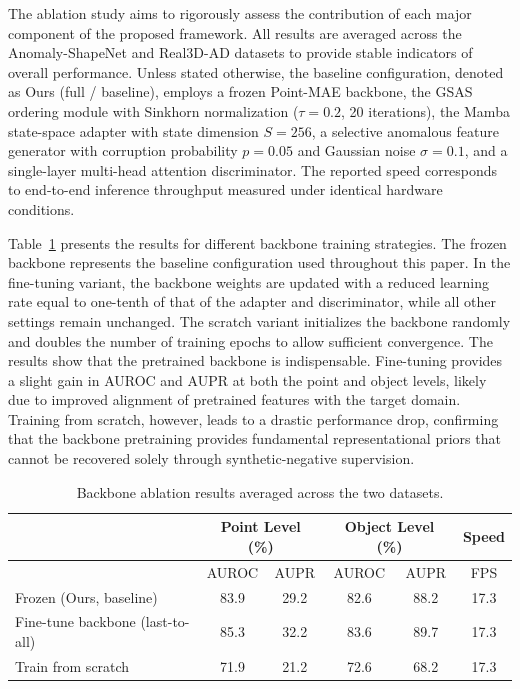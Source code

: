 The ablation study aims to rigorously assess the contribution of each major component of the proposed framework. All results are averaged across the Anomaly-ShapeNet and Real3D-AD datasets to provide stable indicators of overall performance. Unless stated otherwise, the baseline configuration, denoted as Ours (full / baseline), employs a frozen Point-MAE backbone, the GSAS ordering module with Sinkhorn normalization (\(\tau=0.2\), 20 iterations), the Mamba state-space adapter with state dimension \(S=256\), a selective anomalous feature generator with corruption probability \(p=0.05\) and Gaussian noise \(\sigma=0.1\), and a single-layer multi-head attention discriminator. The reported speed corresponds to end-to-end inference throughput measured under identical hardware conditions.

Table~\ref{tab:backbone_ablation} presents the results for different backbone training strategies. The frozen backbone represents the baseline configuration used throughout this paper. In the fine-tuning variant, the backbone weights are updated with a reduced learning rate equal to one-tenth of that of the adapter and discriminator, while all other settings remain unchanged. The scratch variant initializes the backbone randomly and doubles the number of training epochs to allow sufficient convergence. The results show that the pretrained backbone is indispensable. Fine-tuning provides a slight gain in AUROC and AUPR at both the point and object levels, likely due to improved alignment of pretrained features with the target domain. Training from scratch, however, leads to a drastic performance drop, confirming that the backbone pretraining provides fundamental representational priors that cannot be recovered solely through synthetic-negative supervision.

\begin{table}[ht]
\centering
\caption{Backbone ablation results averaged across the two datasets.}
\label{tab:backbone_ablation}
\begin{tabular}{l|cc|cc|c}
\hline
& \multicolumn{2}{c|}{Point Level (\%)} & \multicolumn{2}{c|}{Object Level (\%)} & Speed \\
\hline
& AUROC & AUPR & AUROC & AUPR & FPS \\  
\hline
Frozen (Ours, baseline) & 83.9 & 29.2 & 82.6 & 88.2 & 17.3 \\
Fine-tune backbone (last-to-all) & 85.3 & 32.2 & 83.6 & 89.7 & 17.3 \\
Train from scratch & 71.9 & 21.2 & 72.6 & 68.2 & 17.3 \\
\hline
\end{tabular}
\end{table}

